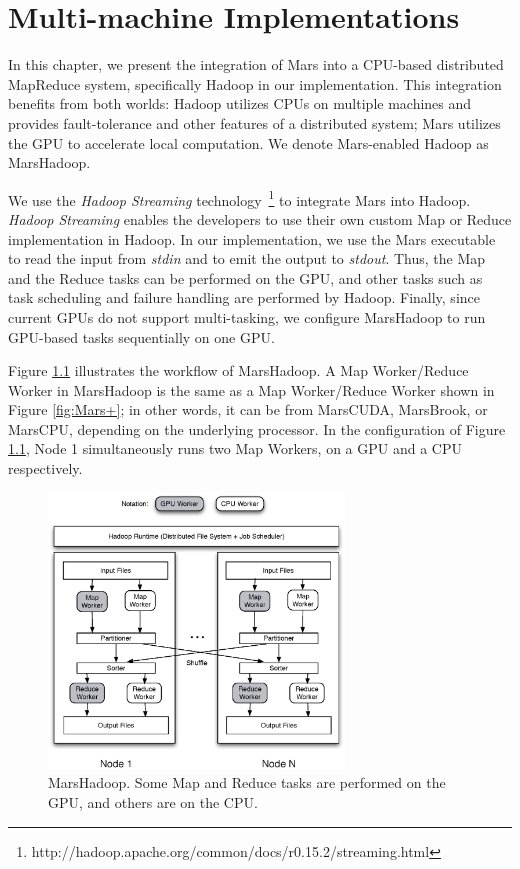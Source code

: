 \chapter{Multi-machine Implementations}\label{sec-beyond}

In this chapter, we present the integration of Mars into a CPU-based distributed MapReduce system, specifically Hadoop in our implementation. 
This integration benefits from both worlds: Hadoop utilizes CPUs on multiple machines and provides fault-tolerance and other features of a distributed system; 
Mars utilizes the GPU to accelerate local computation. We denote Mars-enabled Hadoop as MarsHadoop. 

We use the {\em Hadoop Streaming}
technology~\footnote{http://hadoop.apache.org/common/docs/r0.15.2/streaming.html}
to integrate Mars into Hadoop. {\em Hadoop Streaming} enables the
developers to use their own custom Map or Reduce implementation in
Hadoop. In our implementation, we use the Mars executable to read
the input from {\em stdin} and to emit the output to {\em stdout}.
Thus, the Map and the Reduce tasks can be performed on the GPU, and
other tasks such as task scheduling and failure handling are
performed by Hadoop. Finally, since current GPUs do not support
multi-tasking, we configure MarsHadoop to run GPU-based tasks sequentially on one GPU. 


Figure \ref{fig:hadoop} illustrates the workflow of MarsHadoop. 
A Map Worker/Reduce Worker in MarsHadoop is the same as a Map Worker/Reduce Worker shown in Figure \ref{fig:Mars+}; 
in other words, it can be from MarsCUDA, MarsBrook, or MarsCPU, depending on the underlying processor. 
In the configuration of Figure \ref{fig:hadoop}, Node 1 simultaneously runs two Map Workers, on a GPU and a CPU respectively. 

\begin{figure}[ht]
  \centering
  \includegraphics[width=0.70\textwidth]{figure/hadoop.eps} 
  \caption{MarsHadoop. Some Map and Reduce tasks are performed on the
  GPU, and others are on the CPU. }\label{fig:hadoop}
\end{figure}
